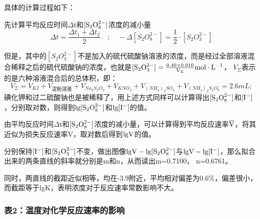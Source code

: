 \documentclass[a4paper,12pt]{article}
\begin{document}
具体的计算过程如下：

先计算平均反应时间$\Delta$t和$\rm [S_2O_8^{2-}]$浓度的减小量
$$
\Delta t = \frac{\Delta t_1+\Delta t_2}{2}\quad;\quad
-\Delta [S_2O_8^{2-}]=\frac{1}{2}\cdot [S_2O_3^{2-}]
$$

但是，其中的$[S_2O_3^{2-}]$不是加入的硫代硫酸钠溶液的浓度，而是经过全部溶液混合稀释之后的硫代硫酸钠的浓度，也就是$\rm [S_2O_3^{2-}]=\frac{0.40\times 0.010}{V_{\Sigma}}mol\cdot L^{-1}$，
$V_{\Sigma}$表示的是六种溶液混合后的总体积，即：
$$
V_{\Sigma}=V_{KI}+V_{\text{淀粉溶液}}+V_{Na_2S_2O_3}+V_{KNO_3}+V_{(NH_4)_2SO_4}+V_{(NH_4)_2S_2O_8}=2.6mL;
$$
碘化钾和过二硫酸钠也是被稀释了，用上述方式同样可以计算得出$\rm [S_2O_8^{2-}]$和$\rm [I^-]$，分别取对数，则得到$\rm lg[S_2O_8^{2-}]$和$\rm lg[I^-]$的值。

由平均反应时间$\Delta$t和$\rm [S_2O_8^{2-}]$浓度的减小量，可以计算得到平均反应速率$\rm \overline{V}$，将其近似为损失反应速率V，取对数后得到$\rm lgV$的值。

分别保持$\rm [I^-]$和$\rm [S_2O_3^{2-}]$不变，做出图像$\rm lgV-lg[S_2O_8^{2-}]$与$\rm lgV-lg[I^-]$，那么拟合出来的两条直线的斜率就分别是m和n，从而读出m=0.7100， n=0.6761。

同时，两直线的截距近似相等，均在-3.9附近，平均相对偏差为$0.6\%$，偏差很小，而截距等于lgK，表明浓度对于反应速率常数影响不大。

\subsubsection*{表2：温度对化学反应速率的影响}
\bigskip
\end{document}
